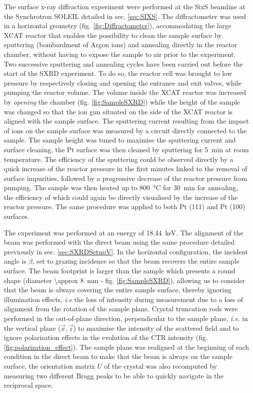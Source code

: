The surface x-ray diffraction experiment were performed at the SixS beamline at the Synchrotron SOLEIL detailed in sec. \ref{sec:SIXS}.
The diffractometer was used in a horizontal geometry (fig. \ref{fig:Diffractometer}), accommodating the large XCAT reactor that enables the possibility to clean the sample surface by sputtering (bombardment of Argon ions) and annealing directly in the reactor chamber, without having to expose the sample to air prior to the experiment.
Two successive sputtering and annealing cycles have been carried out before the start of the SXRD experiment.
To do so, the reactor cell was brought to low pressure by respectively closing and opening the entrance and exit valves, while pumping the reactor volume.
The volume inside the XCAT reactor was increased by \textit{opening} the chamber (fig. \ref{fig:SampleSXRD}) while the height of the sample was changed so that the ion gun situated on the side of the XCAT reactor is aligned with the sample surface.
The sputtering current resulting from the impact of ions on the sample surface was measured by a circuit directly connected to the sample.
The sample height was tuned to maximise the sputtering current and surface cleaning, the Pt surface was then cleaned by sputtering for \qty{5}{\minute} at room temperature.
The efficiency of the sputtering could be observed directly by a quick increase of the reactor pressure in the first minutes linked to the removal of surface impurities, followed by a progressive decrease of the reactor pressure from pumping.
The sample was then heated up to \qty{800}{\degreeCelsius} for \qty{30}{\minute} for annealing, the efficiency of which could again be directly visualised by the increase of the reactor pressure.
The same procedure was applied to both Pt (111) and Pt (100) surfaces.

The experiment was performed at an energy of \qty{18.44}{\keV}.
The alignment of the beam was performed with the direct beam using the same procedure detailed previously in sec. \ref{sec:SXRDSetupV}.
In the horizontal configuration, the incident angle is $\beta$, set to grazing incidence so that the beam recovers the entire sample surface.
The beam footprint is larger than the sample which presents a round shape (diameter \qty{\approx 8}{\mm} - fig. \ref{fig:SampleSXRD}), allowing us to consider that the beam is always covering the entire sample surface, thereby ignoring illumination effects, \textit{i.e} the loss of intensity during measurement due to a loss of alignment from the rotation of the sample plane.
Crystal truncation rods were performed in the out-of-plane direction, perpendicular to the sample plane, \textit{i.e.} in the vertical plane ($\vec{x}, \vec{z}$) to maximise the intensity of the scattered field and to ignore polarisation effects in the evolution of the CTR intensity (fig. \ref{fig:polarization_effect}).
The sample plane was realigned at the beginning of each condition in the direct beam to make that the beam is always on the sample surface, the orientation matrix $U$ of the crystal \parencite{Schleputz2011} was also recomputed by measuring two different Bragg peaks to be able to quickly navigate in the reciprocal space.

